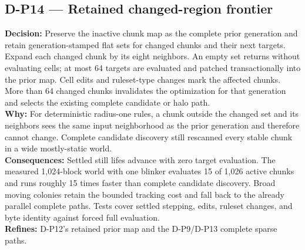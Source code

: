 \subsection*{D-P14 --- Retained changed-region frontier}
\begin{decisionbox}[title={D-P14 \quad 2026-08-08}]
\textbf{Decision:} Preserve the inactive chunk map as the complete prior
generation and retain generation-stamped flat sets for changed chunks and their
next targets. Expand each changed chunk by its eight neighbors. An empty set
returns without evaluating cells; at most 64 targets are evaluated and patched
transactionally into the prior map. Cell edits and ruleset-type changes mark the
affected chunks. More than 64 changed chunks invalidates the optimization for
that generation and selects the existing complete candidate or halo path.\\
\textbf{Why:} For deterministic radius-one rules, a chunk outside the changed
set and its neighbors sees the same input neighborhood as the prior generation
and therefore cannot change. Complete candidate discovery still rescanned every
stable chunk in a wide mostly-static world.\\
\textbf{Consequences:} Settled still lifes advance with zero target evaluation.
The measured 1,024-block world with one blinker evaluates 15 of 1,026 active
chunks and runs roughly 15 times faster than complete candidate discovery.
Broad moving colonies retain the bounded tracking cost and fall back to the
already parallel complete paths. Tests cover settled stepping, edits, ruleset
changes, and byte identity against forced full evaluation.\\
\textbf{Refines:} D-P12's retained prior map and the D-P9/D-P13 complete sparse
paths.
\end{decisionbox}

